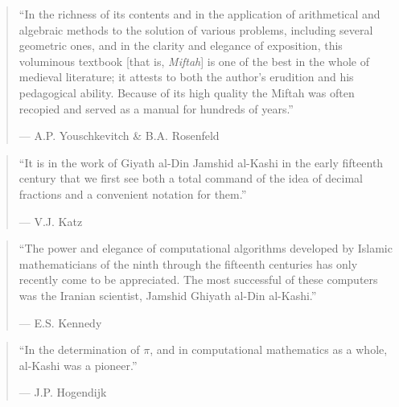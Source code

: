\documentclass[11pt,a4paper,openany,oneside]{book}
\begin{document}
\vspace{0.3cm}

\begin{quote}
``In the richness of its contents and in the application of arithmetical and algebraic methods to the solution of various problems, including several geometric ones, and in the clarity and elegance of exposition, this voluminous textbook [that is, \textit{Miftah}] is one of the best in the whole of medieval literature; it attests to both the author's erudition and his pedagogical ability. Because of its high quality the Miftah was often recopied and served as a manual for hundreds of years.''
\begin{flushright}
--- A.P. Youschkevitch \& B.A. Rosenfeld
\end{flushright}
\end{quote}

\vspace{0.3cm}

\begin{quote}
``It is in the work of Giyath al-Din Jamshid al-Kashi in the early fifteenth century that we first see both a total command of the idea of decimal fractions and a convenient notation for them.''
\begin{flushright}
--- V.J. Katz
\end{flushright}
\end{quote}

\vspace{0.3cm}

\begin{quote}
``The power and elegance of computational algorithms developed by Islamic mathematicians of the ninth through the fifteenth centuries has only recently come to be appreciated. The most successful of these computers was the Iranian scientist, Jamshid Ghiyath al-Din al-Kashi.''
\begin{flushright}
--- E.S. Kennedy
\end{flushright}
\end{quote}

\vspace{0.3cm}

\begin{quote}
``In the determination of $\pi$, and in computational mathematics as a whole, al-Kashi was a pioneer.''
\begin{flushright}
--- J.P. Hogendijk
\end{flushright}
\end{quote}
\end{document}

